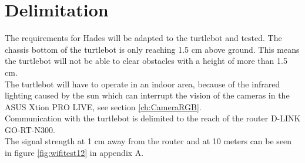 \chapter{Delimitation} \label{ch:Delimitation}
The requirements for Hades will be adapted to the turtlebot and tested. The chassis bottom of the turtlebot is only reaching 1.5 cm above ground. This means the turtlebot will not be able to clear obstacles with a height of more than 1.5 cm.\\
The turtlebot will have to operate in an indoor area, because of the infrared lighting caused by the sun which can interrupt the vision of the cameras in the ASUS Xtion PRO LIVE, see section \ref{ch:CameraRGB}.\\
Communication with the turtlebot is delimited to the reach of the router D-LINK GO-RT-N300.\\
The signal strength at 1 cm away from the router and at 10 meters can be seen in figure \ref{fig:wifitest12} in appendix A.
